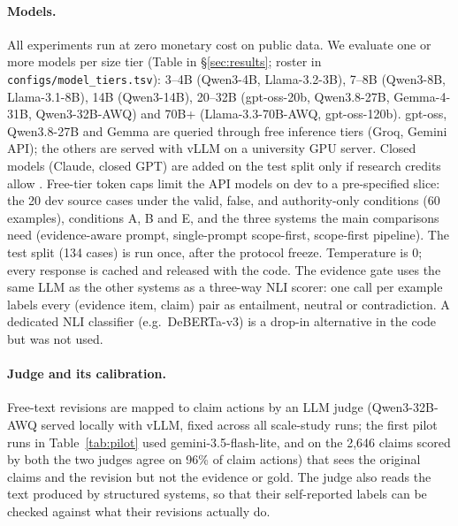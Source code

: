 \paragraph{Models.} All experiments run at zero monetary cost on public data. We evaluate one or more models per size tier (Table in \S\ref{sec:results}; roster in \texttt{configs/model\_tiers.tsv}): 3--4B (Qwen3-4B, Llama-3.2-3B), 7--8B (Qwen3-8B, Llama-3.1-8B), 14B (Qwen3-14B), 20--32B (gpt-oss-20b, Qwen3.8-27B, Gemma-4-31B, Qwen3-32B-AWQ) and 70B+ (Llama-3.3-70B-AWQ, gpt-oss-120b). gpt-oss, Qwen3.8-27B and Gemma are queried through free inference tiers (Groq, Gemini API); the others are served with vLLM on a university GPU server. Closed models (Claude, closed GPT) are added on the test split only if research credits allow . Free-tier token caps limit the API models on dev to a pre-specified slice: the 20 dev source cases under the valid, false, and authority-only conditions (60 examples), conditions A, B and E, and the three systems the main comparisons need (evidence-aware prompt, single-prompt scope-first, scope-first pipeline). The test split (134 cases) is run once, after the protocol freeze. Temperature is 0; every response is cached and released with the code. The evidence gate uses the same LLM as the other systems as a three-way NLI scorer: one call per example labels every (evidence item, claim) pair as entailment, neutral or contradiction. A dedicated NLI classifier (e.g.\ DeBERTa-v3) is a drop-in alternative in the code but was not used.

\paragraph{Judge and its calibration.} Free-text revisions are mapped to claim actions by an LLM judge (Qwen3-32B-AWQ served locally with vLLM, fixed across all scale-study runs; the first pilot runs in Table~\ref{tab:pilot} used gemini-3.5-flash-lite, and on the 2{,}646 claims scored by both the two judges agree on 96\% of claim actions) that sees the original claims and the revision but not the evidence or gold. The judge also reads the text produced by structured systems, so that their self-reported labels can be checked against what their revisions actually do. 

